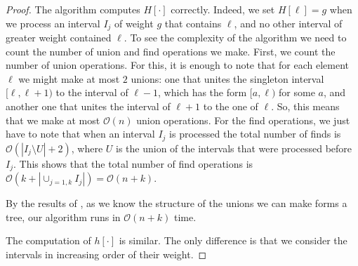 \documentclass[final]{dmtcs-episciences}
\newcommand{\bigo}{{\mathcal O}}
\begin{document}
\begin{proof}
The algorithm computes $H[\cdot]$ correctly. Indeed, we set $H[\ell ]=g$ when we process an interval $I_j$ of weight $g$ that contains $\ell $, and no other interval of greater weight contained $\ell $. To see the complexity of the algorithm we need to count the number of union and find operations we make. First, we count the number of union operations. For this, it is enough to note that for each element $\ell $ we might make at most $2$ unions: one that unites the singleton interval $[\ell ,\ell +1)$ to the interval of $\ell -1$, which has the form $[a,\ell )$ for some $a$, and another one that unites the interval of $\ell +1$ to the one of $\ell $. So, this means that we make at most $\bigo(n)$ union operations. For the find operations, we just have to note that when an interval $I_j$ is processed the total number of finds is $\bigo(|I_j \setminus U|+2)$, where $U$ is the union of the intervals that were processed before $I_j$. This shows that the total number of find operations is $\bigo(k+|\cup_{j=1,k}I_j|)=\bigo(n+k)$. 

By the results of \cite{Gabow83}, as we know the structure of the unions we can make forms a tree, our algorithm runs in $\bigo(n+k)$ time. 

The computation of $h[\cdot]$ is similar. The only difference is that we consider the intervals in increasing order of their weight.
\end{proof}
\end{document}
